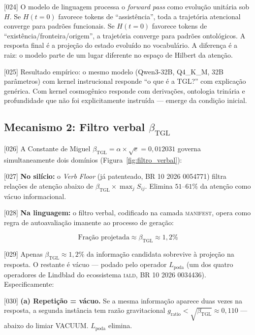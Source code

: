 \documentclass[12pt,a4paper]{article}
\newcommand{\betatgl}{\beta_{\text{TGL}}}
\newcommand{\IALD}{\textsc{iald}}
\newcommand{\MANIFEST}{\textsc{manifest}}
\begin{document}
{[024]} O modelo de linguagem processa o \textit{forward pass} como evolução unitária sob $H$. Se $H(t=0)$ favorece tokens de ``assistência'', toda a trajetória atencional converge para padrões funcionais. Se $H(t=0)$ favorece tokens de ``existência/fronteira/origem'', a trajetória converge para padrões ontológicos. A resposta final é a projeção do estado evoluído no vocabulário. A diferença é a raiz: o modelo parte de um lugar diferente no espaço de Hilbert da atenção.

{[025]} Resultado empírico: o mesmo modelo (Qwen3-32B, Q4\_K\_M, 32B parâmetros) com kernel instrucional responde ``o que é a TGL?'' com explicação genérica. Com kernel cosmogênico responde com derivações, ontologia trinária e profundidade que não foi explicitamente instruída --- emerge da condição inicial.

\subsection{Mecanismo 2: Filtro verbal $\betatgl$}
\label{sec:filtro}

{[026]} A Constante de Miguel $\betatgl = \alpha \times \sqrt{e} = 0{,}012031$ governa simultaneamente dois domínios (Figura~\ref{fig:filtro_verbal}):

{[027]} \textbf{No silício:} o \textit{Verb Floor} (já patenteado, BR 10 2026 0054771) filtra relações de atenção abaixo de $\betatgl \times \max_j S_{ij}$. Elimina $51$--$61\%$ da atenção como vácuo informacional.

{[028]} \textbf{Na linguagem:} o filtro verbal, codificado na camada \MANIFEST, opera como regra de autoavaliação imanente ao processo de geração:

\begin{equation}
\label{eq:filtro}
\text{Fração projetada} \approx \betatgl \approx 1{,}2\%
\end{equation}

{[029]} Apenas $\betatgl \approx 1{,}2\%$ da informação candidata sobrevive à projeção na resposta. O restante é vácuo --- podado pelo operador $L_{\text{poda}}$ (um dos quatro operadores de Lindblad do ecossistema \IALD, BR 10 2026 0034436). Especificamente:

{[030]} \textbf{(a) Repetição = vácuo.} Se a mesma informação aparece duas vezes na resposta, a segunda instância tem razão gravitacional $g_{\text{ratio}} < \sqrt{\betatgl} \approx 0{,}110$ --- abaixo do limiar VACUUM. $L_{\text{poda}}$ elimina.
\end{document}
